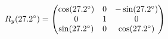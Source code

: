 \documentclass[preview]{standalone}
\begin{document}
\begin{align*}
\special{dvisvgm:raw <g id='unique000'>}R_y(27.2^\circ) = \begin{pmatrix} \cos(27.2^\circ) & 0 & -\sin(27.2^\circ) \\ 0 & 1 & 0 \\ \sin(27.2^\circ) & 0 & \cos(27.2^\circ) \end{pmatrix}\special{dvisvgm:raw </g>}
\end{align*}
\end{document}
